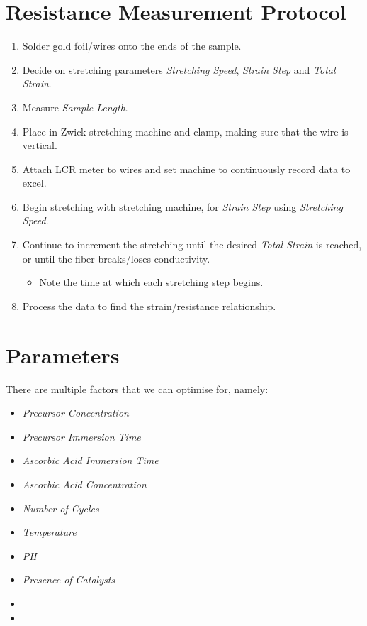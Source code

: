 \documentclass[a4paper, oneside]{discothesis}
\begin{document}
\section{Resistance Measurement Protocol}
\label{resistance_protocol}
\begin{enumerate}
    \item Solder gold foil/wires onto the ends of the sample.
    \item Decide on stretching parameters \textit{Stretching Speed}, \textit{Strain Step} and \textit{Total Strain}.
    \item Measure \textit{Sample Length}.
    \item Place in Zwick stretching machine and clamp, making sure that the wire is vertical.
    \item Attach LCR meter to wires and set machine to continuously record data to excel.
    \item Begin stretching with stretching machine, for \textit{Strain Step} using \textit{Stretching Speed}.
    \item Continue to increment the stretching until the desired \textit{Total Strain}
    is reached, 
    or until the fiber breaks/loses conductivity.
        \begin{itemize}
            \item Note the time at which each stretching step begins.
        \end{itemize}
    \item Process the data to find the strain/resistance relationship.
    
\end{enumerate}

\pagebreak
\section{Parameters}
There are multiple factors that we can optimise for, namely:
\begin{multicols}{2}
\begin{itemize}
    \item \textit{Precursor Concentration}
    \item \textit{Precursor Immersion Time}
    \item \textit{Ascorbic Acid Immersion Time}
    \item \textit{Ascorbic Acid Concentration}
    \item \textit{Number of Cycles}
    \item \textit{Temperature}
    \item \textit{PH}
    \item \textit{Presence of Catalysts}
    \item[\vspace{\fill}]
    \item[\vspace{\fill}]
    \end{itemize}
\end{multicols}
\end{document}
